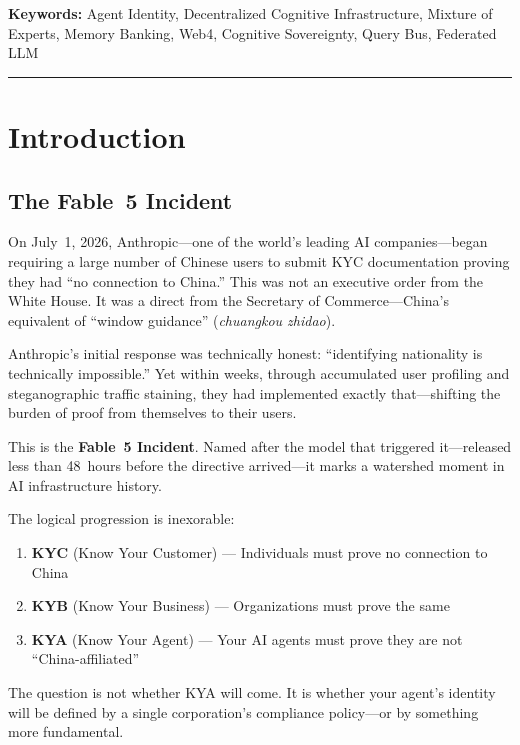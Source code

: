\documentclass[11pt,a4paper]{article}
\newcommand{\webfour}{Web4}
\begin{document}
\noindent\textbf{Keywords:} Agent Identity, Decentralized Cognitive Infrastructure, Mixture of Experts, Memory Banking, \webfour, Cognitive Sovereignty, Query Bus, Federated LLM

\medskip
\noindent\rule{\textwidth}{0.4pt}

\section{Introduction}
\label{sec:introduction}

\subsection{The Fable~5 Incident}
\label{sub:fable5}

On July~1, 2026, Anthropic---one of the world's leading AI companies---began requiring a large number of Chinese users to submit KYC documentation proving they had ``no connection to China.''
This was not an executive order from the White House.
It was a direct from the Secretary of Commerce---China's equivalent of ``window guidance'' (\emph{chuangkou zhidao}).

Anthropic's initial response was technically honest: ``identifying nationality is technically impossible.''
Yet within weeks, through accumulated user profiling and steganographic traffic staining, they had implemented exactly that---shifting the burden of proof from themselves to their users.

This is the \textbf{Fable~5 Incident}.
Named after the model that triggered it---released less than 48~hours before the directive arrived---it marks a watershed moment in AI infrastructure history.

The logical progression is inexorable:
\begin{enumerate}
  \item \textbf{KYC} (Know Your Customer) --- Individuals must prove no connection to China
  \item \textbf{KYB} (Know Your Business) --- Organizations must prove the same
  \item \textbf{KYA} (Know Your Agent) --- Your AI agents must prove they are not ``China-affiliated''
\end{enumerate}

The question is not whether KYA will come.
It is whether your agent's identity will be defined by a single corporation's compliance policy---or by something more fundamental.
\end{document}
